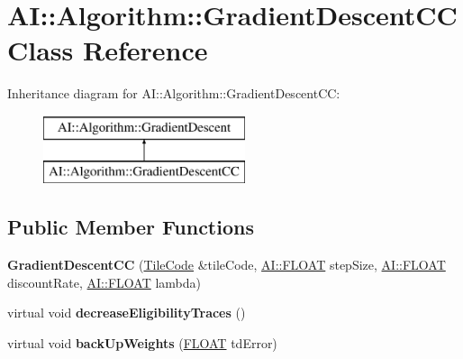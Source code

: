 \hypertarget{classAI_1_1Algorithm_1_1GradientDescentCC}{\section{A\-I\-:\-:Algorithm\-:\-:Gradient\-Descent\-C\-C Class Reference}
\label{classAI_1_1Algorithm_1_1GradientDescentCC}
}
Inheritance diagram for A\-I\-:\-:Algorithm\-:\-:Gradient\-Descent\-C\-C\-:\begin{figure}[H]
\begin{center}
\leavevmode
\includegraphics[height=2.000000cm]{classAI_1_1Algorithm_1_1GradientDescentCC}
\end{center}
\end{figure}
\subsection*{Public Member Functions}
\begin{DoxyCompactItemize}
\item 
\hypertarget{classAI_1_1Algorithm_1_1GradientDescentCC_a036943a3f05d8e9146e833d225b13d74}{{\bfseries Gradient\-Descent\-C\-C} (\hyperlink{classAI_1_1Algorithm_1_1TileCode}{Tile\-Code} \&tile\-Code, \hyperlink{namespaceAI_a41b74884a20833db653dded3918e05c3}{A\-I\-::\-F\-L\-O\-A\-T} step\-Size, \hyperlink{namespaceAI_a41b74884a20833db653dded3918e05c3}{A\-I\-::\-F\-L\-O\-A\-T} discount\-Rate, \hyperlink{namespaceAI_a41b74884a20833db653dded3918e05c3}{A\-I\-::\-F\-L\-O\-A\-T} lambda)}\label{classAI_1_1Algorithm_1_1GradientDescentCC_a036943a3f05d8e9146e833d225b13d74}

\item 
\hypertarget{classAI_1_1Algorithm_1_1GradientDescentCC_a5cd9bd033e8556b4961370da3298cfce}{virtual void {\bfseries decrease\-Eligibility\-Traces} ()}\label{classAI_1_1Algorithm_1_1GradientDescentCC_a5cd9bd033e8556b4961370da3298cfce}

\item 
\hypertarget{classAI_1_1Algorithm_1_1GradientDescentCC_a990c4b429edd9583e0e0a56be43faad8}{virtual void {\bfseries back\-Up\-Weights} (\hyperlink{namespaceAI_a41b74884a20833db653dded3918e05c3}{F\-L\-O\-A\-T} td\-Error)}\label{classAI_1_1Algorithm_1_1GradientDescentCC_a990c4b429edd9583e0e0a56be43faad8}

\end{DoxyCompactItemize}
